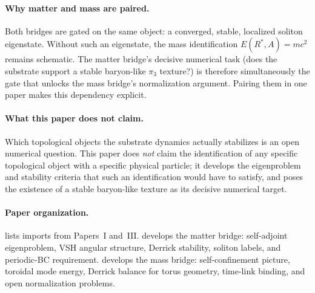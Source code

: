 \paragraph{Why matter and mass are paired.}
Both bridges are gated on the same object: a converged, stable, localized soliton eigenstate.
Without such an eigenstate, the mass identification $E(R^*,A)=mc^2$ remains schematic.
The matter bridge's decisive numerical task (does the substrate support a stable baryon-like
$\pi_3$ texture?) is therefore simultaneously the gate that unlocks the mass bridge's
normalization argument.
Pairing them in one paper makes this dependency explicit.

\paragraph{What this paper does not claim.}
Which topological objects the substrate dynamics actually stabilizes is an open numerical question.
This paper does \emph{not} claim the identification of any specific topological object with a
specific physical particle; it develops the eigenproblem and stability criteria that such an
identification would have to satisfy, and poses the existence of a stable baryon-like texture as
its decisive numerical target.

\paragraph{Paper organization.}
 lists imports from Papers~I and~III.
 develops the matter bridge: self-adjoint eigenproblem, VSH angular structure,
Derrick stability, soliton labels, and periodic-BC requirement.
 develops the mass bridge: self-confinement picture, toroidal mode energy, Derrick
balance for torus geometry, time-link binding, and open normalization problems.